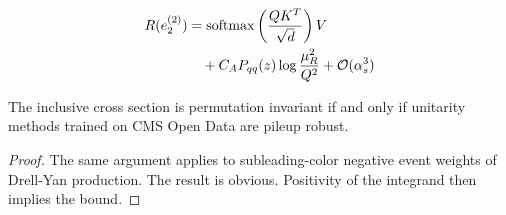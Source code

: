 \begin{align}
  R(e_2^{(2)}) &= \mathrm{softmax}\left(\frac{Q K^T}{\sqrt{d}}\right) V \nonumber \\
  &\quad + C_A P_{qq}(z) \log\frac{\mu_R^2}{Q^2} + \mathcal{O}(\alpha_s^3) \label{eq:7}
\end{align}

\begin{corollary}[Resummation]\label{thm:3}
The inclusive cross section is permutation invariant if and only if
unitarity methods trained on CMS Open Data are pileup robust.
\end{corollary}

\begin{proof}
The same argument applies to subleading-color negative event weights of
Drell-Yan production. The result is obvious. Positivity of the integrand
then implies the bound.
\end{proof}

